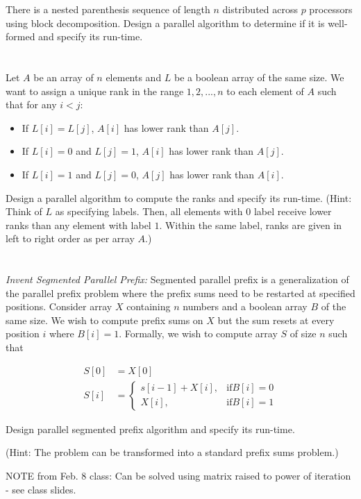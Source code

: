 \documentclass[twoside,10pt]{article}
\newcommand{\aln}[1]{\begin{align*}#1\end{align*}}
\begin{document}
There is a nested parenthesis sequence of length $n$ distributed across $p$ processors using block decomposition.
Design a parallel algorithm to determine if it is well-formed and specify its run-time.

\section{}

Let $A$ be an array of $n$ elements and $L$ be a boolean array of the same size.
We want to assign a unique rank in the range $1, 2, ..., n$ to each element of $A$ such that for any $i < j$:
\begin{itemize}
\item If $L[i] = L[j]$, $A[i]$ has lower rank than $A[j]$.
\item If $L[i] = 0$ and $L[j] = 1$, $A[i]$ has lower rank than $A[j]$.
\item If $L[i] = 1$ and $L[j] = 0$, $A[j]$ has lower rank than $A[i]$.
\end{itemize}

Design a parallel algorithm to compute the ranks and specify its run-time.
(Hint: Think of $L$ as specifying labels.
Then, all elements with $0$ label receive lower ranks than any element with label $1$.
Within the same label, ranks are given in left to right order as per array $A$.)

\section{}

\textsl{Invent Segmented Parallel Prefix:}
Segmented parallel prefix is a generalization of the parallel prefix problem where the prefix sums need to be restarted at specified positions.
Consider array $X$ containing $n$ numbers and a boolean array $B$ of the same size.
We wish to compute prefix sums on $X$ but the sum resets at every position $i$ where $B[i] = 1$.
Formally, we wish to compute array $S$ of size $n$ such that

\aln{
  S[0] &= X[0]\\
  S[i] &=
    \begin{cases*}
      s[i-1] + X[i],&\text{if} B[i] = 0\\
      X[i],&\text{if} B[i] = 1
    \end{cases*}
}

Design parallel segmented prefix algorithm and specify its run-time.

(Hint: The problem can be transformed into a standard prefix sums problem.)

NOTE from Feb. 8 class: Can be solved using matrix raised to power of iteration - see class slides.
\end{document}
